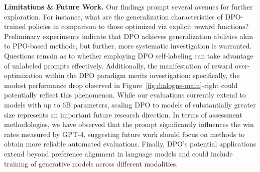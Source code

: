 \textbf{Limitations \& Future Work.} Our findings prompt several avenues for further exploration. For instance, what are the generalization characteristics of DPO-trained policies in comparison to those optimized via explicit reward functions? Preliminary experiments indicate that DPO achieves generalization abilities akin to PPO-based methods, but further, more systematic investigation is warranted. Questions remain as to whether employing DPO self-labeling can take advantage of unlabeled prompts effectively. Additionally, the manifestation of reward over-optimization within the DPO paradigm merits investigation; specifically, the modest performance drop observed in Figure~\ref{fig:dialogue-main}-right could potentially reflect this phenomenon. While our evaluations currently extend to models with up to 6B parameters, scaling DPO to models of substantially greater size represents an important future research direction. In terms of assessment methodologies, we have observed that the prompt significantly influences the win rates measured by GPT-4, suggesting future work should focus on methods to obtain more reliable automated evaluations. Finally, DPO’s potential applications extend beyond preference alignment in language models and could include training of generative models across different modalities.